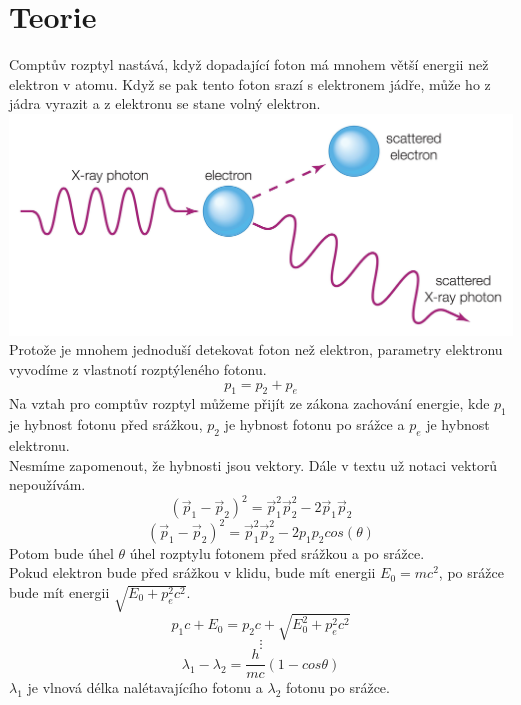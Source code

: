 \documentclass{article}
\begin{document}
\section{Teorie}
Comptův rozptyl nastává, když dopadající foton má mnohem větší energii než elektron v atomu.
Když se pak tento foton srazí s elektronem jádře, může ho z jádra vyrazit a z elektronu se stane volný elektron.\\
\includegraphics[scale=0.08]{comp.jpg}\\
Protože je mnohem jednoduší detekovat foton než elektron, parametry elektronu vyvodíme z vlastnotí rozptýleného fotonu.
$$p_{1} = p_{2} + p_{e}$$
Na vztah pro comptův rozptyl můžeme přijít ze zákona zachování energie, kde $p_{1}$ je hybnost fotonu před srážkou, $p_{2}$ je hybnost fotonu po srážce a $p_{e}$ je hybnost elektronu.\\
Nesmíme zapomenout, že hybnosti jsou vektory. Dále v textu už notaci vektorů nepoužívám.
$$(\vec{p}_{1} - \vec{p}_{2})^{2} = \vec{p}_{1}^{2} \vec{p}_{2}^{2} -2\vec{p}_{1}\vec{p}_{2}$$
$$(\vec{p}_{1} - \vec{p}_{2})^{2} = \vec{p}_{1}^{2} \vec{p}_{2}^{2} -2p_{1}p_{2}cos(\theta)$$
Potom bude úhel $\theta$ úhel rozptylu fotonem před srážkou a po srážce.\\
Pokud elektron bude před srážkou v klidu, bude mít energii $E_{0} = mc^{2}$, po srážce bude
mít energii $\sqrt{E_{0} + p^{2}_{e}c^{2}}$.
$$p_{1}c + E_{0} = p_{2}c + \sqrt{E_{0}^{2} + p_{e}^{2}c^{2}}$$
$$\vdots$$
\begin{equation}
  \lambda_{1} - \lambda_{2} = \frac{h}{mc} (1-cos\theta)
\end{equation}
$\lambda_{1}$ je vlnová délka nalétavajícího fotonu a $\lambda_{2}$ fotonu po srážce.
\end{document}
